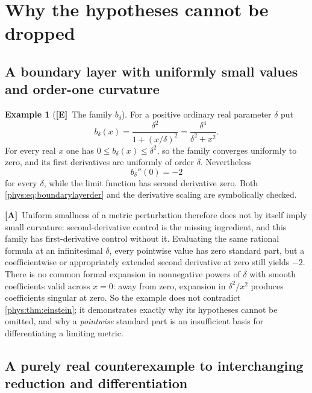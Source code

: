 \documentclass[11pt,letterpaper]{article}
\numberwithin{equation}{section}
\theoremstyle{definition}
\newtheorem{example}[theorem]{Example}
\theoremstyle{remark}
\newcommand{\TE}{\textcolor{TierE}{\textsf{\bfseries[E]}}}
\newcommand{\TA}{\textcolor{TierA}{\textsf{\bfseries[A]}}}
\begin{document}
\section{Why the hypotheses cannot be dropped}
\label{phys:sec:hypotheses}

\subsection{A boundary layer with uniformly small values and order-one
curvature}
\label{phys:sub:boundarylayer}

\begin{example}[\TE\ The family $b_{\delta}$]
\label{phys:ex:boundarylayer}
For a positive ordinary real parameter $\delta$ put
\begin{equation}\label{phys:eq:boundarylayer}
b_{\delta}(x)=\frac{\delta^{2}}{1+(x/\delta)^{2}}
=\frac{\delta^{4}}{\delta^{2}+x^{2}}.
\end{equation}
For every real $x$ one has $0\le b_{\delta}(x)\le\delta^{2}$, so the family
converges uniformly to zero, and its first derivatives are uniformly of order
$\delta$. Nevertheless
\begin{equation}\label{phys:eq:boundarylayerder}
b_{\delta}''(0)=-2
\end{equation}
for every $\delta$, while the limit function has second derivative zero. Both
\eqref{phys:eq:boundarylayerder} and the derivative scaling are symbolically
checked.
\end{example}

\TA\ Uniform smallness of a metric perturbation therefore does not by itself
imply small curvature: second-derivative control is the missing ingredient, and
this family has first-derivative control without it. Evaluating the same
rational formula at an infinitesimal $\delta$, every pointwise value has zero
standard part, but a coefficientwise or appropriately extended second
derivative at zero still yields $-2$. There is no common formal expansion in
nonnegative powers of $\delta$ with smooth coefficients valid across $x=0$:
away from zero, expansion in $\delta^{2}/x^{2}$ produces coefficients singular
at zero. So the example does not contradict \cref{phys:thm:einstein}; it
demonstrates exactly why its hypotheses cannot be omitted, and why a
\emph{pointwise} standard part is an insufficient basis for differentiating a
limiting metric.

\subsection{A purely real counterexample to interchanging reduction and
differentiation}
\label{phys:sub:oscillatory}
\end{document}
